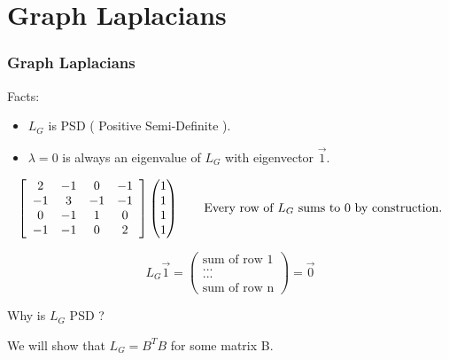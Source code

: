 \documentclass{beamer}
\begin{document}
\section{Graph Laplacians}
\begin{frame}
\frametitle{\textbf{Graph Laplacians} }
Facts: \vspace{0.2 cm}

\begin{itemize}
    \item $L_{G}$ is PSD ( Positive Semi-Definite ).
    \item $\lambda = 0$ is always an eigenvalue of $L_{G}$ with eigenvector $\vec{1}$.
\end{itemize}


\begin{equation*}
    \left\lbrack\begin{array}{cccc}
        2  & -1 & 0  & -1 \\
        -1 & 3  & -1 & -1 \\
        0  & -1 & 1  & 0  \\
        -1 & -1 & 0  & 2  \\
    \end{array}\right\rbrack
    \begin{pmatrix} 
        1 \\ 
        1 \\ 
        1 \\ 
        1
    \end{pmatrix}
    \tag*{Every row of $L_{G}$ sums to 0 by construction.}
\end{equation*}

\begin{equation*}
    L_{G}\vec{1} = 
    \begin{pmatrix} 
        \text{sum of row 1} \\ 
        ... \\ 
        ... \\ 
        \text{sum of row n}
    \end{pmatrix}
    = \vec{0}
\end{equation*}


Why is $L_{G}$ PSD ? \vspace{0.2 cm}

We will show that $L_{G} = B^{T}B$ for some matrix B.
\end{frame}
\end{document}
